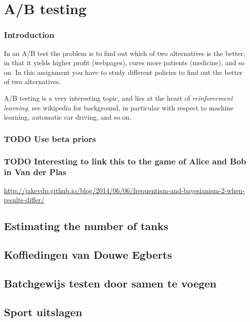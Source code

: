 \documentclass[a4paper]{article}
\begin{document}
\section{A/B testing}
\label{sec:org180b96a}
\subsubsection{Introduction}
\label{sec:org41a02a9}

In an A/B test the problem is to find out which of two alternatives is the better, in that it yields higher profit (webpages), cures more patients (medicine), and so on. In this assignment you have to study different policies to find out the better of two alternatives. 

A/B testing is a very interesting topic, and lies at the heart of \emph{reinforcement learning}, see wikipedia for background, in particular with respect to machine learning, automatic car driving, and so on. 


\subsubsection{{\bfseries\sffamily TODO} Use beta priors}
\label{sec:org9297a86}
\subsubsection{{\bfseries\sffamily TODO} Interesting to link this to the game of Alice and Bob in Van der Plas}
\label{sec:orgafbfbd0}
\url{http://jakevdp.github.io/blog/2014/06/06/frequentism-and-bayesianism-2-when-results-differ/}

\subsection{Estimating the number of tanks}
\label{sec:org0700c8f}


\subsection{Koffiedingen van Douwe Egberts}
\label{sec:orgbe91c90}

\subsection{Batchgewijs testen door samen te voegen}
\label{sec:org7f21ad2}



\subsection{Sport uitslagen}
\label{sec:org9a46c5b}
\end{document}
